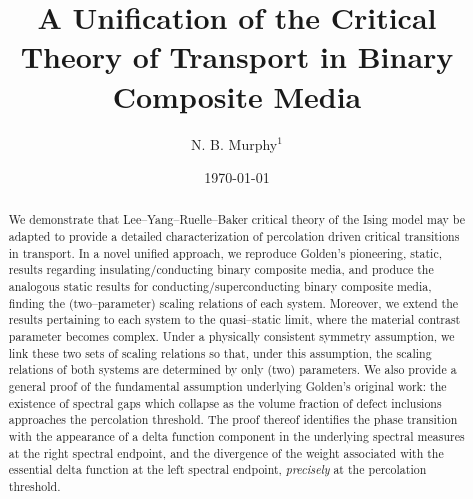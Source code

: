 \documentclass[english,12pt,jmp,graphicx]{revtex4-1}
\begin{document}

\title{A Unification of the Critical Theory of Transport in Binary
  Composite Media} %



\author{N. B. Murphy$^1$}
%


\date{\today}

\begin{abstract}
%
We demonstrate that Lee--Yang--Ruelle--Baker critical theory of the
Ising model may be adapted to provide a detailed characterization of
percolation driven critical transitions in transport. In a novel
unified approach, we reproduce Golden's pioneering, static, results
regarding insulating/conducting binary composite media, and produce
the analogous static results for conducting/superconducting binary
composite media, finding the (two--parameter) scaling relations of
each system. Moreover, we extend the results pertaining to each system
to the quasi--static limit, where the material contrast parameter
becomes complex. Under a physically consistent symmetry assumption, we
link these two sets of scaling relations so that, under this
assumption, the scaling relations of both systems are determined by
only (two) parameters. We also provide a general proof of the
fundamental assumption underlying Golden's original work: the
existence of spectral gaps which collapse as the volume fraction of
defect inclusions approaches the percolation threshold. The proof
thereof identifies the phase transition with the appearance of a delta
function component in the underlying spectral measures at the right
spectral endpoint, and the divergence of the weight associated with
the essential delta function at the left spectral endpoint,
\emph{precisely} at the percolation threshold.  
%
\end{abstract}
\end{document}
